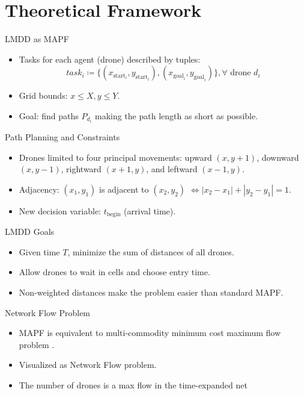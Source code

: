 \section{Theoretical Framework}

\begin{frame}{LMDD as MAPF}
    \begin{itemize}
        \item Tasks for each agent (drone) described by tuples:
        \[
        task_i \coloneq \{(x_{\text{start}_i}, y_{\text{start}_i}) , (x_{\text{goal}_i}, y_{\text{goal}_i})\}, \forall \text{ drone } d_i
        \]
        \item Grid bounds: $x \leq X, y \leq Y$.
        \item Goal: find paths $P_{d_i}$ making the path length as short as possible.
    \end{itemize}
\end{frame}

\begin{frame}{Path Planning and Constraints}
    \begin{itemize}
        \item Drones limited to four principal movements: upward $(x, y+1)$, downward $(x, y-1)$, rightward $(x+1, y)$, and leftward $(x-1, y)$.
        \item Adjacency: $(x_1,y_1)$ is adjacent to $(x_2,y_2)$ $\iff |x_2-x_1| + |y_2-y_1| = 1$.
        \item New decision variable: $t_{\text{begin}}$ (arrival time).
    \end{itemize}
\end{frame}

\begin{frame}{LMDD Goals}
    \begin{itemize}
        \item Given time $T$, minimize the sum of distances of all drones.
        \item Allow drones to wait in cells and choose entry time.
        \item Non-weighted distances make the problem easier than standard MAPF.
    \end{itemize}
\end{frame}

\begin{frame}{Network Flow Problem}
    \begin{itemize}
        \item MAPF is equivalent to multi-commodity minimum cost maximum flow problem \cite{lavalle}.
        \item Visualized as Network Flow problem.
        \item The number of drones is a max flow in the time-expanded net
    \end{itemize}
\end{frame}



